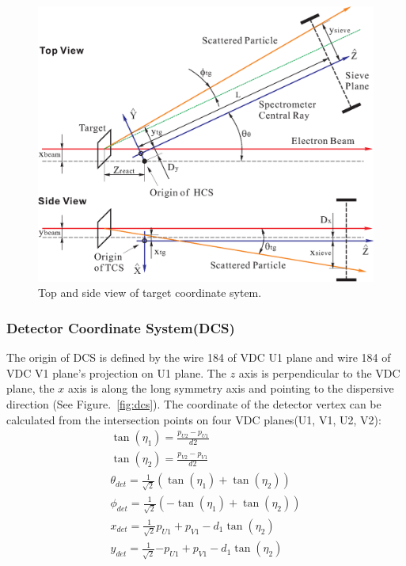 \begin{figure}
  \begin{center}
	\includegraphics[scale=0.8]{figs/tcs}
  \end{center}
  \caption[Top and side view of target coordinate sytem]%
  {Top and side view of target coordinate sytem.}
  \label{fig:tcs}
\end{figure}

\subsubsection{Detector Coordinate System(DCS)}

The origin of DCS is defined by the wire 184 of VDC U1 plane and wire
184 of VDC V1 plane's projection on U1 plane. The $z$ axis is perpendicular
to the VDC plane, the $x$ axis is along the long symmetry axis and pointing
to the dispersive direction (See Figure.~\ref{fig:dcs}).
The coordinate of the detector vertex can be calculated from the
intersection points on four VDC planes(U1, V1, U2, V2):
  \begin{align}
  \tan (\eta_1) = \frac{p_{U2} - p_{U1}}{d2} \\
  \tan (\eta_2) = \frac{p_{V2} - p_{V1}}{d2} \\
  \theta_{det} = \frac{1}{\sqrt{2}} (\tan(\eta_1)+\tan(\eta_2)) \\
  \phi_{det} = \frac{1}{\sqrt{2}} (-\tan(\eta_1)+\tan(\eta_2))  \\
  x_{det} = \frac{1}{\sqrt{2}}{p_{U1}+p_{V1}-d_1 \tan(\eta_2)}  \\
  y_{det} = \frac{1}{\sqrt{2}}{-p_{U1}+p_{V1}-d_1 \tan(\eta_2)} 
  \end{align}

